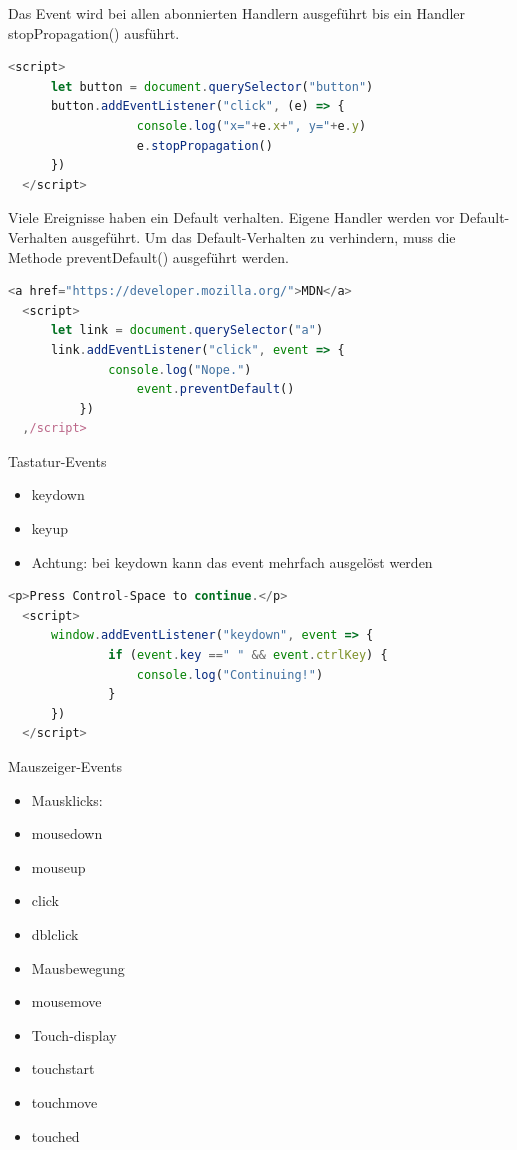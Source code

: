   Das Event wird bei allen abonnierten Handlern ausgeführt bis ein Handler stopPropagation() ausführt.
  
  \begin{lstlisting}[language=JavaScript, style=basesmol]
  <script>
      let button = document.querySelector("button")
      button.addEventListener("click", (e) => {
                  console.log("x="+e.x+", y="+e.y)
                  e.stopPropagation()
      })
  </script>
  \end{lstlisting}
  
  Viele Ereignisse haben ein Default verhalten. Eigene Handler werden vor Default-Verhalten ausgeführt. Um das Default-Verhalten zu verhindern, muss die Methode preventDefault() ausgeführt werden.
  
  \begin{lstlisting}[language=JavaScript, style=basesmol]
  <a href="https://developer.mozilla.org/">MDN</a>
  <script>
      let link = document.querySelector("a")
      link.addEventListener("click", event => {
              console.log("Nope.")
                  event.preventDefault()
          })
  ,/script>
  \end{lstlisting}
  
  \begin{definition}{Tastatur-Events}
  \begin{itemize}
    \item keydown
    \item keyup
    \item Achtung: bei keydown kann das event mehrfach ausgelöst werden
  \end{itemize}
  
  \begin{lstlisting}[language=JavaScript, style=basesmol]
  <p>Press Control-Space to continue.</p>
  <script>
      window.addEventListener("keydown", event => {
              if (event.key ==" " && event.ctrlKey) {
                  console.log("Continuing!")
              }
      })
  </script>
  \end{lstlisting}
\end{definition}
  
  Mauszeiger-Events
  
  \begin{itemize}
    \item Mausklicks:
    \item mousedown
    \item mouseup
    \item click
    \item dblclick
    \item Mausbewegung
    \item mousemove
    \item Touch-display
    \item touchstart
    \item touchmove
    \item touched
  \end{itemize}
  
